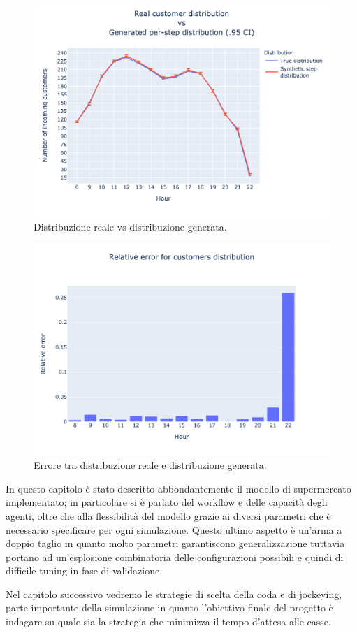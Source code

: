 \begin{figure}[H]
	\centering
	\includegraphics[width=14cm]{"images/real_vs_synthetic_distribution.png"}
	\caption{Distribuzione reale vs distribuzione generata.}
	\label{fig:real_vs_synthetic_distribution}
\end{figure}

\begin{figure}[H]
	\centering
	\includegraphics[width=14cm]{"images/real_vs_synthetic_distribution_error.png"}
	\caption{Errore tra distribuzione reale e distribuzione generata.}
	\label{fig:real_vs_synthetic_distribution_error}
\end{figure}

\vspace*{1\baselineskip}

In questo capitolo è stato descritto abbondantemente il modello di supermercato implementato; in particolare si è parlato del workflow e delle capacità degli agenti, oltre che alla flessibilità del modello grazie ai diversi parametri che è necessario specificare per ogni simulazione. Questo ultimo aspetto è un'arma a doppio taglio in quanto molto parametri garantiscono generalizzazione tuttavia portano ad un'esplosione combinatoria delle configurazioni possibili e quindi di difficile tuning in fase di validazione.

Nel capitolo successivo vedremo le strategie di scelta della coda e di jockeying, parte importante della simulazione in quanto l'obiettivo finale del progetto è indagare su quale sia la strategia che minimizza il tempo d'attesa alle casse.